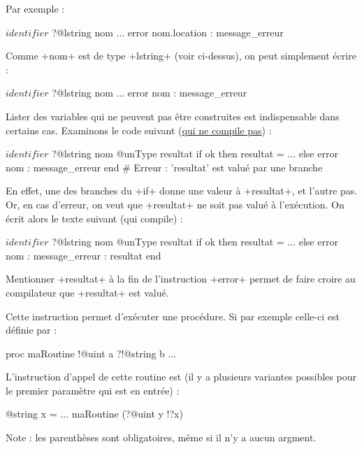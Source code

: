 Par exemple :

\begin{galgas}
$identifier$ ?@lstring nom
...
error nom.location : message_erreur
\end{galgas}

Comme \ggs+nom+ est de type \ggs+lstring+ (voir ci-dessus), on peut simplement écrire :
\begin{galgas}
$identifier$ ?@lstring nom
...
error nom : message_erreur
\end{galgas}


Lister des variables qui ne peuvent pas être construites est indispensable dans certains cas. Examinons le code suivant (\underline{qui ne compile pas}) :
\begin{galgas}
$identifier$ ?@lstring nom
@unType resultat
if ok then
  resultat = ...
else
  error nom : message_erreur
end # Erreur : 'resultat' est valué par une branche
\end{galgas}

En effet, une des branches du \ggs+if+ donne une valeur à \ggs+resultat+, et l'autre pas. Or, en cas d'erreur, on veut que \ggs+resultat+ ne soit pas valué à l'exécution. On écrit alors le texte suivant (qui compile) :
\begin{galgas}
$identifier$ ?@lstring nom
@unType resultat
if ok then
  resultat = ...
else
  error nom : message_erreur : resultat
end
\end{galgas}

Mentionner \ggs+resultat+ à la fin de l'instruction \ggs+error+ permet de faire croire au compilateur que \ggs+resultat+ est valué.




Cette instruction permet d'exécuter une procédure. Si par exemple celle-ci est définie par :
\begin{galgas}
proc maRoutine !@uint a ?!@string b {
  ...
}
\end{galgas}

L'instruction d'appel de cette routine est (il y a plusieurs variantes possibles pour le premier paramètre qui est en entrée) :
\begin{galgas}
@string x = ...
maRoutine (?@uint y !?x)
\end{galgas}

Note : les parenthèses sont obligatoires, même si il n'y a aucun argment.

